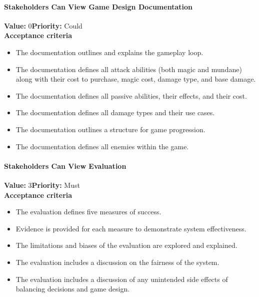 \paragraph{Stakeholders Can View Game Design Documentation}
\textbf{Value:} 0\quad \textbf{Priority:} Could\\
\textbf{Acceptance criteria}
\begin{itemize}
  \item The documentation outlines and explains the gameplay loop.
  \item The documentation defines all attack abilities (both magic and mundane) along with their cost to purchase, magic cost, damage type, and base damage.
  \item The documentation defines all passive abilities, their effects, and their cost.
  \item The documentation defines all damage types and their use cases.
  \item The documentation outlines a structure for game progression.
  \item The documentation defines all enemies within the game.
\end{itemize}

\paragraph{Stakeholders Can View Evaluation}
\textbf{Value:} 3\quad \textbf{Priority:} Must\\
\textbf{Acceptance criteria}
\begin{itemize}
  \item The evaluation defines five measures of success.
  \item Evidence is provided for each measure to demonstrate system effectiveness.
  \item The limitations and biases of the evaluation are explored and explained.
  \item The evaluation includes a discussion on the fairness of the system.
  \item The evaluation includes a discussion of any unintended side effects of balancing decisions and game design.
\end{itemize}
